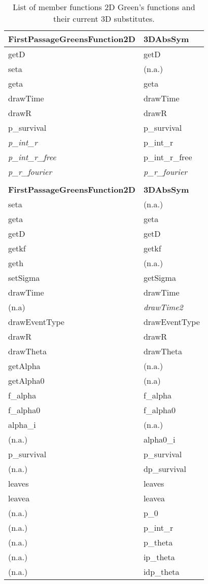 \documentclass[a4paper,10pt]{article}
\begin{document}
\begin{table}[h!]
\caption{List of member functions 2D Green's functions and their current 3D substitutes.}
\label{table:memberfunctions}
\begin{tabular}{ p{} p{} }
  \textbf{FirstPassageGreensFunction2D} & \textbf{3DAbsSym} \\ \hline

    getD & getD \\
    seta & (n.a.) \\
    geta & geta \\
    drawTime & drawTime \\
    drawR & drawR \\ \hline
    p\_survival & p\_survival \\
    
    \textit{p\_int\_r} & p\_int\_r \\
    \textit{p\_int\_r\_free} & p\_int\_r\_free \\
    \textit{p\_r\_fourier} & \textit{p\_r\_fourier} \\ 

  & \\
  \textbf{FirstPassageGreensFunction2D} & \textbf{3DAbsSym} \\ \hline

    seta & (n.a.) \\
    geta & geta \\
    getD & getD \\
    getkf & getkf \\
    geth & (n.a.) \\ \hline
    setSigma & getSigma \\
    drawTime & drawTime \\
    (n.a) & \textit{drawTime2} \\
    drawEventType & drawEventType \\ 
    drawR & drawR \\ \hline 
    drawTheta & drawTheta \\
    getAlpha & (n.a.) \\
    getAlpha0 & (n.a) \\
    f\_alpha & f\_alpha \\
    f\_alpha0 & f\_alpha0 \\ \hline
    alpha\_i & (n.a.) \\
    (n.a.) & alpha0\_i \\
    p\_survival & p\_survival \\
    (n.a.) & dp\_survival \\
    leaves & leaves \\ \hline 
    leavea & leavea \\
    (n.a.) & p\_0 \\
    (n.a.) & p\_int\_r \\
    (n.a.) & p\_theta \\
    (n.a.) & ip\_theta \\ \hline
    (n.a.) & idp\_theta \\


\end{tabular}
\end{table}
\end{document}
